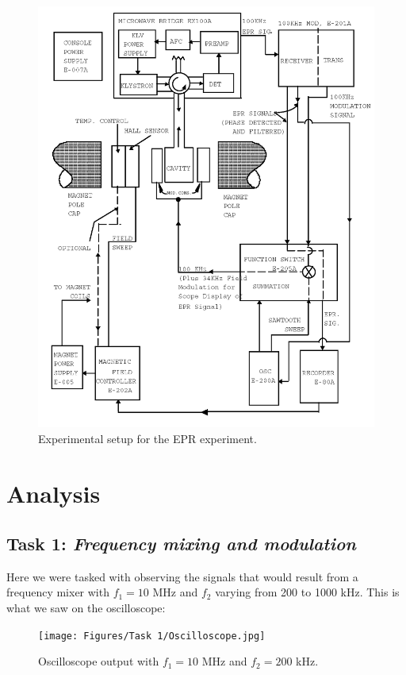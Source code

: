 \documentclass{article}
\begin{document}
\begin{figure}[h]
	\centering
	\includegraphics[width=\textwidth]{Figures/Intro/EPR.png}
	\caption{Experimental setup for the EPR experiment.}
	\label{fig:setup}
\end{figure}

\pagebreak{}

\section{Analysis}

\subsection{Task 1: \textit{Frequency mixing and modulation}}

Here we were tasked with observing the signals that would result from a frequency mixer with $f_1 = 10$ MHz and $f_2$ varying from 200 to 1000 kHz. This is what we saw on the oscilloscope:

\begin{figure}[h]
	\centering
	\texttt{[image: Figures/Task 1/Oscilloscope.jpg]}
	\caption{Oscilloscope output with $f_1 = 10$ MHz and $f_2 = 200$ kHz.}
	\label{fig:oscilloscope}
\end{figure}
\end{document}
